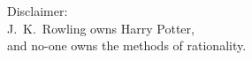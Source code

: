 \newpage
\vspace*{4cm}
\begin{center}
Disclaimer:\\J.~K.~Rowling owns Harry Potter,\\and no-one owns the methods of rationality.
\end{center}